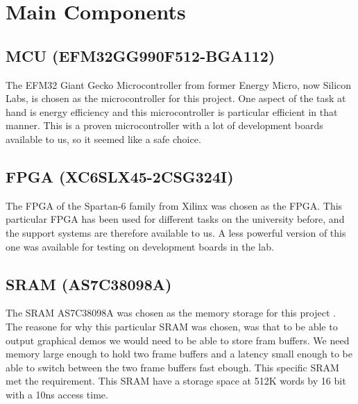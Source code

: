 \documentclass[../main/report.tex]{subfiles}
\begin{document}
\section{Main Components}

\subsection*{MCU (EFM32GG990F512-BGA112)}
The EFM32 Giant Gecko Microcontroller from former Energy Micro, now Silicon Labs, is chosen as the microcontroller for this project.
One aspect of the task at hand is energy efficiency and this microcontroller is particular efficient in that manner.
This is a proven microcontroller with a lot of development boards available to us, so it seemed like a safe choice.

\subsection*{FPGA (XC6SLX45-2CSG324I)}
The FPGA of the Spartan-6 family from Xilinx was chosen as the FPGA.
This particular FPGA has been used for different tasks on the university before, and the support systems are therefore available to us.
A less powerful version of this one was available for testing on development boards in the lab.

\subsection*{SRAM (AS7C38098A)}
The SRAM AS7C38098A was chosen as the memory storage for this project \cite{SRAM-datasheet}. 
The reasone for why this particular SRAM was chosen, was that to be able to output graphical demos we would need to be able to store fram buffers.
We need  memory large enough to hold two frame buffers and a latency small enough to be able to switch between the two frame buffers fast ebough.
This specific SRAM met the requirement.
This SRAM have a storage space at 512K words by 16 bit with a 10ns access time.
\end{document}
